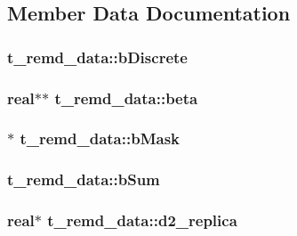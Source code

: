 \subsection{\-Member \-Data \-Documentation}
\hypertarget{structt__remd__data_a45834036c12bbfa2c9b8e0ae1f8bfe0f}{
\subsubsection[{b\-Discrete}]{ {\bf t\-\_\-remd\-\_\-data\-::b\-Discrete}}}\label{structt__remd__data_a45834036c12bbfa2c9b8e0ae1f8bfe0f}
\hypertarget{structt__remd__data_ac65067287ee7887510fef96d2b40af36}{
\subsubsection[{beta}]{\setlength{\rightskip}{0pt plus 5cm}real$\ast$$\ast$ {\bf t\-\_\-remd\-\_\-data\-::beta}}}\label{structt__remd__data_ac65067287ee7887510fef96d2b40af36}
\hypertarget{structt__remd__data_a3a52ea208a6507f57f5d792e2557d4f1}{
\subsubsection[{b\-Mask}]{$\ast$ {\bf t\-\_\-remd\-\_\-data\-::b\-Mask}}}\label{structt__remd__data_a3a52ea208a6507f57f5d792e2557d4f1}
\hypertarget{structt__remd__data_a517a574c8134f9b96f86e93d03499d86}{
\subsubsection[{b\-Sum}]{ {\bf t\-\_\-remd\-\_\-data\-::b\-Sum}}}\label{structt__remd__data_a517a574c8134f9b96f86e93d03499d86}
\hypertarget{structt__remd__data_ad77b53f9d5b8ba7f07039588ad71f125}{
\subsubsection[{d2\-\_\-replica}]{\setlength{\rightskip}{0pt plus 5cm}real$\ast$ {\bf t\-\_\-remd\-\_\-data\-::d2\-\_\-replica}}}\label{structt__remd__data_ad77b53f9d5b8ba7f07039588ad71f125}
